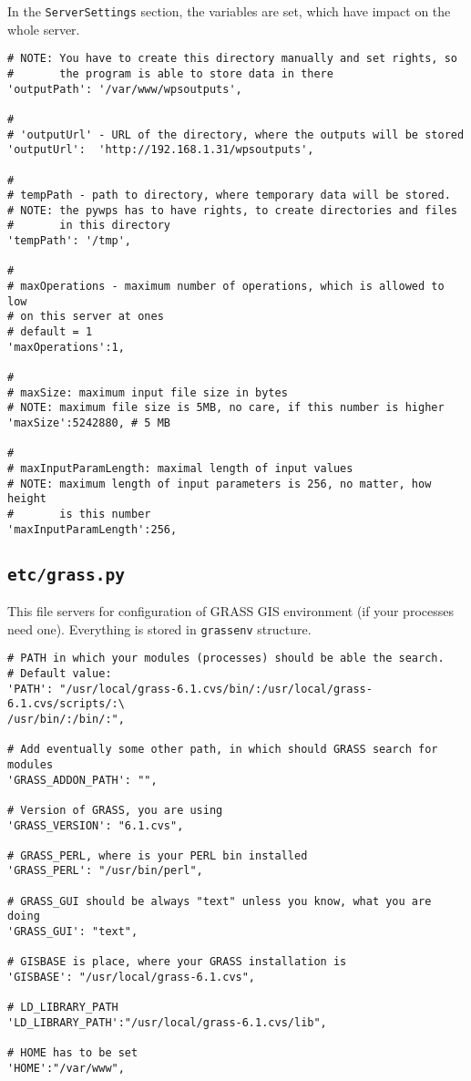 \documentclass[a4paper,11pt]{article}
\begin{document}
    
In the \texttt{ServerSettings} section, the variables are set, which have impact on
the whole server.
    

\begin{verbatim}
# NOTE: You have to create this directory manually and set rights, so
#       the program is able to store data in there 
'outputPath': '/var/www/wpsoutputs',

#
# 'outputUrl' - URL of the directory, where the outputs will be stored
'outputUrl':  'http://192.168.1.31/wpsoutputs',

#
# tempPath - path to directory, where temporary data will be stored.
# NOTE: the pywps has to have rights, to create directories and files
#       in this directory
'tempPath': '/tmp',

#
# maxOperations - maximum number of operations, which is allowed to low
# on this server at ones 
# default = 1
'maxOperations':1,

#
# maxSize: maximum input file size in bytes
# NOTE: maximum file size is 5MB, no care, if this number is higher
'maxSize':5242880, # 5 MB

#
# maxInputParamLength: maximal length of input values
# NOTE: maximum length of input parameters is 256, no matter, how height
#       is this number
'maxInputParamLength':256,
\end{verbatim}


\subsection{\texttt{etc/grass.py}}
    
This file servers for configuration of GRASS GIS environment (if your
processes need one). Everything is stored in \texttt{grassenv} structure. 
    

\begin{verbatim}
# PATH in which your modules (processes) should be able the search.
# Default value:
'PATH': "/usr/local/grass-6.1.cvs/bin/:/usr/local/grass-6.1.cvs/scripts/:\
/usr/bin/:/bin/:",

# Add eventually some other path, in which should GRASS search for modules
'GRASS_ADDON_PATH': "",

# Version of GRASS, you are using
'GRASS_VERSION': "6.1.cvs",

# GRASS_PERL, where is your PERL bin installed
'GRASS_PERL': "/usr/bin/perl",

# GRASS_GUI should be always "text" unless you know, what you are doing
'GRASS_GUI': "text",

# GISBASE is place, where your GRASS installation is
'GISBASE': "/usr/local/grass-6.1.cvs",

# LD_LIBRARY_PATH
'LD_LIBRARY_PATH':"/usr/local/grass-6.1.cvs/lib",

# HOME has to be set
'HOME':"/var/www",
\end{verbatim}
\end{document}
